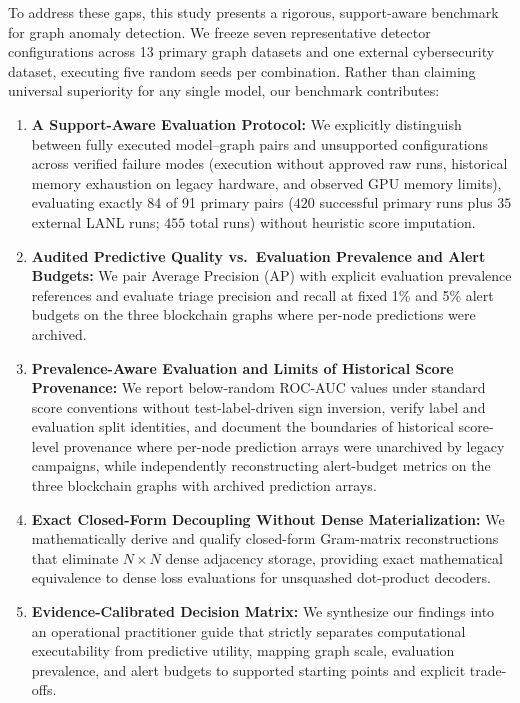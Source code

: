 \documentclass[11pt,a4paper]{article}
\begin{document}
To address these gaps, this study presents a rigorous, support-aware benchmark for graph anomaly detection. We freeze seven representative detector configurations across 13 primary graph datasets and one external cybersecurity dataset, executing five random seeds per combination. Rather than claiming universal superiority for any single model, our benchmark contributes:
\begin{enumerate}
    \item \textbf{A Support-Aware Evaluation Protocol:} We explicitly distinguish between fully executed model--graph pairs and unsupported configurations across verified failure modes (execution without approved raw runs, historical memory exhaustion on legacy hardware, and observed GPU memory limits), evaluating exactly 84 of 91 primary pairs ($420$ successful primary runs plus $35$ external LANL runs; $455$ total runs) without heuristic score imputation.
    \item \textbf{Audited Predictive Quality vs.\ Evaluation Prevalence and Alert Budgets:} We pair Average Precision (AP) with explicit evaluation prevalence references and evaluate triage precision and recall at fixed 1\% and 5\% alert budgets on the three blockchain graphs where per-node predictions were archived.
    \item \textbf{Prevalence-Aware Evaluation and Limits of Historical Score Provenance:} We report below-random ROC-AUC values under standard score conventions without test-label-driven sign inversion, verify label and evaluation split identities, and document the boundaries of historical score-level provenance where per-node prediction arrays were unarchived by legacy campaigns, while independently reconstructing alert-budget metrics on the three blockchain graphs with archived prediction arrays.
    \item \textbf{Exact Closed-Form Decoupling Without Dense Materialization:} We mathematically derive and qualify closed-form Gram-matrix reconstructions that eliminate $N \times N$ dense adjacency storage, providing exact mathematical equivalence to dense loss evaluations for unsquashed dot-product decoders.
    \item \textbf{Evidence-Calibrated Decision Matrix:} We synthesize our findings into an operational practitioner guide that strictly separates computational executability from predictive utility, mapping graph scale, evaluation prevalence, and alert budgets to supported starting points and explicit trade-offs.
\end{enumerate}
\end{document}
